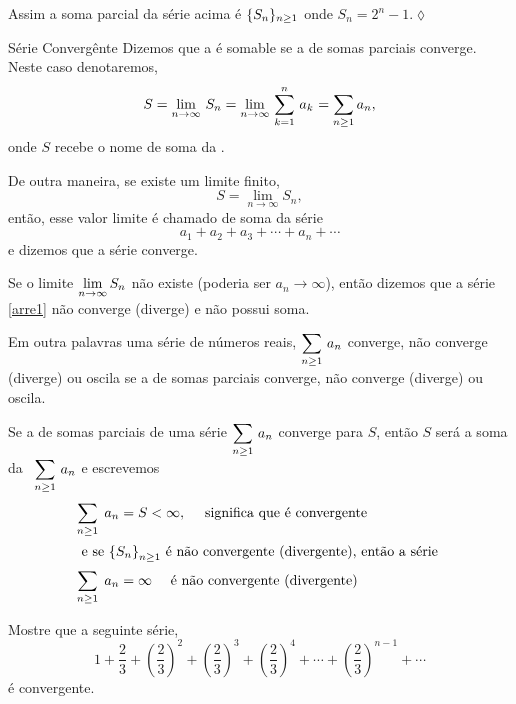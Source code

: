 Assim a soma parcial da s\'{e}rie acima \'{e} $\displaystyle{\{S_n\}_{n\geq 1}}$
onde $S_n=2^n-1$.\hfill \(\lozenge\)

\begin{defic}{Série Convergênte}{}
Dizemos que a \seq {} \'{e} somable se a \seq de somas
parciais  converge. Neste caso denotaremos,
\begin{equation*}
  S=\displaystyle{\lim_{n\to \infty}\,{S}_{n}}=\displaystyle{\lim_{n\to \infty}\,{\sum_{k=1}^{n}\,a_k}_{}}=\sum_{n\geq
  1}a_n,
\end{equation*}
onde $S$ recebe o nome de soma da \seq {}.
\end{defic}

De outra maneira, se existe um limite finito,
\begin{equation*}
    S=\lim_{n\to \infty}S_n,
\end{equation*}
ent\~{a}o, esse valor limite \'{e} chamado de soma da s\'{e}rie
\begin{equation}\label{arre1}
    a_1+a_2+a_3+\cdots+a_n+\cdots
\end{equation}
e dizemos que a s\'{e}rie converge.

Se o limite $\displaystyle{\lim_{n\to \infty}S_n}$ n\~{a}o existe (poderia ser
$a_n\to\infty$), ent\~{a}o dizemos que a s\'{e}rie \eqref{arre1} n\~{a}o
converge (diverge) e n\~{a}o possui soma.

Em outra palavras uma s\'{e}rie de n\'{u}meros reais, $\displaystyle{\sum_{n\geq 1
}\,a_n}$ converge, n\~{a}o converge (diverge) ou oscila se a \seqs de
somas parciais converge, n\~{a}o converge (diverge) ou oscila.


\begin{obs}
Se a \seq {} de somas parciais de uma s\'{e}rie
$\displaystyle{\sum_{n\geq 1 }\,a_n}$ converge para $S$, ent\~{a}o $S$ ser\'{a} a
soma da \ser\ $\displaystyle{\sum_{n\geq 1 }\,a_n}$ e escrevemos
\begin{align*}
  \sum_{n\geq 1}\;a_n &=S< \infty,\quad \text{ significa que \'{e} convergente }  \\
  \intertext{ e se \ensuremath{\displaystyle{\left\{S_{n}\right\}_{n\geq 1}}} \'{e} n\~{a}o convergente (divergente), ent\~{a}o a \mbox{s\'erie }}
  \sum_{n\geq 1}\;a_n &= \infty\quad \text{  \'{e} n\~{a}o convergente (divergente) }
\end{align*}
\end{obs}


\begin{exer}
Mostre que a seguinte s\'{e}rie,
\begin{equation}\label{arre2}
1+\frac{2}{3}+\left(\frac{2}{3}\right)^2+\left(\frac{2}{3}\right)^3+\left(\frac{2}{3}\right)^4
+\cdots+\left(\frac{2}{3}\right)^{n-1}+\cdots
\end{equation}
\'{e} convergente.
\end{exer}

